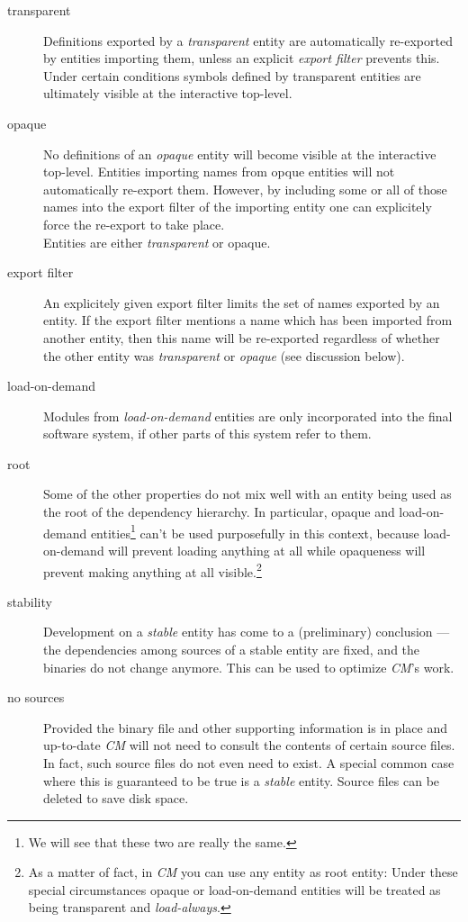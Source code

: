 \begin{description}

\item[transparent] Definitions exported by a {\em transparent} entity are
automatically re-exported by entities importing them, unless an explicit
{\em export filter} prevents this.  Under certain conditions symbols
defined by transparent entities are ultimately visible at the interactive
top-level.

\item[opaque] No definitions of an {\em opaque} entity will become visible
at the interactive top-level.  Entities importing names from opque entities
will not automatically re-export them. However, by including some or all of
those names into the export filter of the importing entity one can
explicitely force the re-export to take place. \\
Entities are either {\em transparent} or opaque.

\item[export filter] An explicitely given export filter limits the set of
names exported by an entity.  If the export filter mentions a name which
has been imported from another entity, then this name will be re-exported
regardless of whether the other entity was {\em transparent} or {\em
opaque} (see discussion below).

\item[load-on-demand] Modules from {\em load-on-demand} entities are only
incorporated into the final software system, if other parts of this system
refer to them.

\item[root] Some of the other properties do not mix well with an entity
being used as the root of the dependency hierarchy.  In particular, opaque
and load-on-demand entities\footnote{We will see that these two are really
the same.} can't be used purposefully in this context, because
load-on-demand will prevent loading anything at all while opaqueness will
prevent making anything at all visible.\footnote{As a matter of fact, in
{\em CM} you can use any entity as root entity: Under these special
circumstances opaque or load-on-demand entities will be treated as being
transparent and {\em load-always}.}

\item[stability] Development on a {\em stable} entity has come to a
(preliminary) conclusion --- the dependencies among sources of a stable
entity are fixed, and the binaries do not change anymore.  This can be used
to optimize {\em CM}\/'s work.

\item[no sources] Provided the binary file and other supporting information
is in place and up-to-date {\em CM} will not need to consult the contents
of certain source files.  In fact, such source files do not even need to
exist.  A special common case where this is guaranteed to be true is a {\em
stable} entity.  Source files can be deleted to save disk space.

\end{description}

